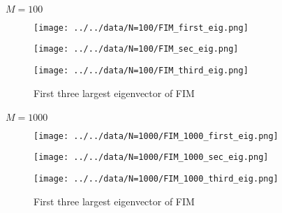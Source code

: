 \documentclass[
]{article}
\makeatletter
\let\oldparagraph\paragraph
\renewcommand{\paragraph}{
    \@ifstar
      \xxxParagraphStar
      \xxxParagraphNoStar
  }
\newcommand{\xxxParagraphStar}[1]{\oldparagraph*{#1}\mbox{}}
\newcommand{\xxxParagraphNoStar}[1]{\oldparagraph{#1}\mbox{}}
\makeatother
\begin{document}
\paragraph{\texorpdfstring{\(M = 100\)}{M = 100}}\label{m-100}

\begin{figure}

\begin{minipage}{0.33\linewidth}

\texttt{[image: ../../data/N=100/FIM\_first\_eig.png]}

\end{minipage}%
%
\begin{minipage}{0.33\linewidth}

\texttt{[image: ../../data/N=100/FIM\_sec\_eig.png]}

\end{minipage}%
%
\begin{minipage}{0.33\linewidth}

\texttt{[image: ../../data/N=100/FIM\_third\_eig.png]}

\end{minipage}%

\caption{\label{fig-eig100}First three largest eigenvector of FIM}

\end{figure}%

\paragraph{\texorpdfstring{\(M = 1000\)}{M = 1000}}\label{m-1000}

\begin{figure}

\begin{minipage}{0.33\linewidth}

\texttt{[image: ../../data/N=1000/FIM\_1000\_first\_eig.png]}

\end{minipage}%
%
\begin{minipage}{0.33\linewidth}

\texttt{[image: ../../data/N=1000/FIM\_1000\_sec\_eig.png]}

\end{minipage}%
%
\begin{minipage}{0.33\linewidth}

\texttt{[image: ../../data/N=1000/FIM\_1000\_third\_eig.png]}

\end{minipage}%

\caption{\label{fig-eig1000}First three largest eigenvector of FIM}

\end{figure}%
\end{document}
